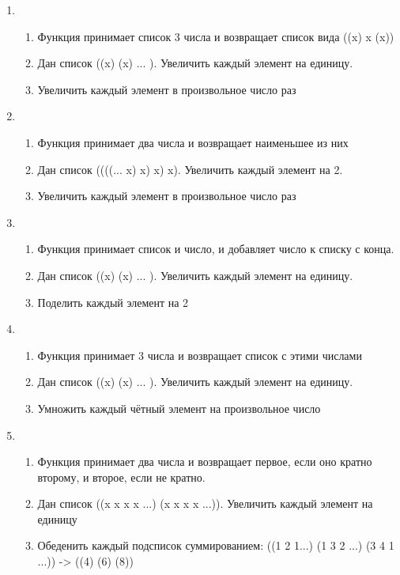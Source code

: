 \documentclass[a4paper,12pt]{article}
\begin{document}
\begin{enumerate}
	\item \begin{enumerate}
		\item Функция принимает список 3 числа и возвращает список вида ((x) x (x))
		\item Дан список ((x) (x) ... ). Увеличить каждый элемент на единицу.
		\item Увеличить каждый элемент в произвольное число раз
	\end{enumerate}

	\item \begin{enumerate}
		\item Функция принимает два числа и возвращает наименьшее из них
		\item Дан список ((((... x) x) x) x). Увеличить каждый элемент на 2.
		\item Увеличить каждый элемент в произвольное число раз
	\end{enumerate}

	\item \begin{enumerate}
		\item Функция принимает список и число, и добавляет число к списку с конца.
		\item Дан список ((x) (x) ... ). Увеличить каждый элемент на единицу.
		\item Поделить каждый элемент на 2
	\end{enumerate}

	\item \begin{enumerate}
		\item Функция принимает 3 числа и возвращает список с этими числами
		\item Дан список ((x) (x) ... ). Увеличить каждый элемент на единицу.
		\item Умножить каждый чётный элемент на произвольное число
	\end{enumerate}

	\item \begin{enumerate}
		\item Функция принимает два числа и возвращает первое, если оно кратно второму, и второе, если не кратно.
		\item Дан список ((x x x x ...) (x x x x ...)). Увеличить каждый элемент на единицу
		\item Обеденить каждый подсписок суммированием: ((1 2 1...) (1 3 2 ...) (3 4 1 ...)) -> ((4) (6) (8))
	\end{enumerate}

\end{enumerate}
\end{document}
